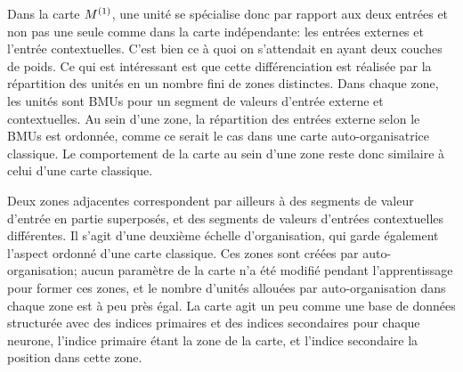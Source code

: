 Dans la carte $M^{({1})}$, une unité se spécialise donc par rapport aux deux entrées et non pas une seule comme dans la carte indépendante: les entrées externes et l'entrée contextuelles. C'est bien ce à quoi on s'attendait en ayant deux couches de poids. Ce qui est intéressant est que cette différenciation est réalisée par la répartition des unités en un nombre fini de zones distinctes. Dans chaque zone, les unités sont BMUs pour un segment de valeurs d'entrée externe et contextuelles. Au sein d'une zone, la répartition des entrées externe selon le BMUs est ordonnée, comme ce serait le cas dans une carte auto-organisatrice classique. Le comportement de la carte au sein d'une zone reste donc similaire à celui d'une carte classique.

Deux zones adjacentes correspondent par ailleurs à des segments de valeur d'entrée en partie superposés, et des segments de valeurs d'entrées contextuelles différentes. Il s'agit d'une deuxième échelle d'organisation, qui garde également l'aspect ordonné d'une carte classique. Ces zones sont créées par auto-organisation; aucun paramètre de la carte n'a été modifié pendant l'apprentissage pour former ces zones, et le nombre d'unités allouées par auto-organisation dans chaque zone est à peu près égal. La carte agit un peu comme une base de données structurée avec des indices primaires et des indices secondaires pour chaque neurone, l'indice primaire étant la zone de la carte, et l'indice secondaire la position dans cette zone.

